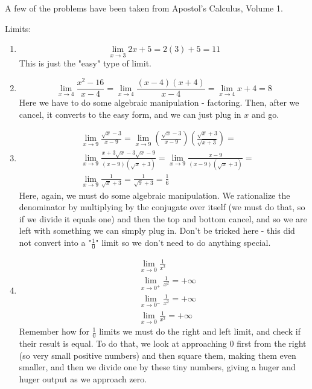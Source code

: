 A few of the problems have been taken from Apostol's Calculus, Volume 1.

Limits:
\begin{enumerate}
\item \begin{equation*}
    \lim\limits_{x\rightarrow 3} 2x+5 = 2(3)+5 = 11
\end{equation*} This is just the "easy" type of limit.
\item \begin{equation*}
    \lim\limits_{x\rightarrow 4}\frac{x^2-16}{x-4} = \lim\limits_{x\rightarrow 4}\frac{(x-4)(x+4)}{x-4} = \lim\limits_{x\rightarrow 4}x+4 = 8
\end{equation*} Here we have to do some algebraic manipulation - factoring. Then, after we cancel, it converts to the easy form, and we can just plug in $x$ and go.
\item \begin{align*}
    & \lim\limits_{x\rightarrow 9}\frac{\sqrt{x}-3}{x-9}=  \lim\limits_{x\rightarrow 9}\left(\frac{\sqrt{x}-3}{x-9}\right) \left(\frac{\sqrt{x}+3}{\sqrt{x+3}}\right) = \\  &\lim\limits_{x\rightarrow 9} \frac{x+3\sqrt{x}-3\sqrt{x}-9}{(x-9) (\sqrt{x}+3)}=\lim\limits_{x\rightarrow 9}\frac{x-9}{(x-9)(\sqrt{x}+3)} = \\ & \lim\limits_{x\rightarrow 9}\frac{1}{\sqrt{x}+3} =\frac{1}{\sqrt{9}+3}=\frac{1}{6}
\end{align*}
Here, again, we must do some algebraic manipulation. 
We rationalize the denominator by multiplying by the conjugate over itself (we must do that, so if we divide it equals one) and then the top and bottom cancel, and so we are left with something we can simply plug in. 
Don't be tricked here - this did not convert into a "$\frac{1}{0}$" limit so we don't need to do anything special.
\item \begin{align*}
    &\lim\limits_{x\rightarrow 0} \frac{1}{x^2}\\
    &\lim\limits_{x\rightarrow 0^+} \frac{1}{x^2} = +\infty\\
    &\lim\limits_{x\rightarrow 0^-} \frac{1}{x^2} = +\infty\\
    &\lim\limits_{x\rightarrow 0} \frac{1}{x^2} = +\infty
\end{align*}
Remember how for $\frac{1}{0}$ limits we must do the right and left limit, and check if their result is equal. 
To do that, we look at approaching $0$ first from the right (so very small positive numbers) and then square them, making them even smaller, and then we divide one by these tiny numbers, giving a huger and huger output as we approach zero. 

\end{enumerate}
